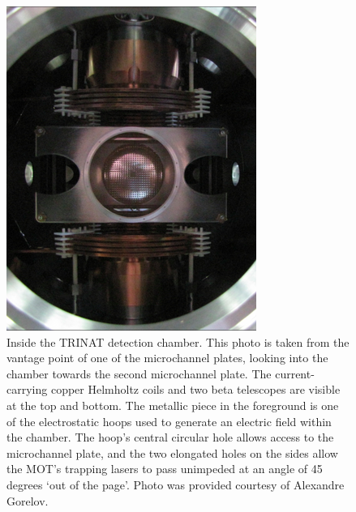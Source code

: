 \begin{figure}[h!b!t]
	\centering
	\includegraphics[width=.80\linewidth]{Figures/chamber_photo_2.png}
	\caption[A Photo from Inside the TRINAT Detection Chamber]{Inside the TRINAT detection chamber.  This photo is taken from the vantage point of one of the microchannel plates, looking into the chamber towards the second microchannel plate.  The current-carrying copper Helmholtz coils and two beta telescopes are visible at the top and bottom.  The metallic piece in the foreground is one of the electrostatic hoops used to generate an electric field within the chamber.  The hoop's central circular hole allows access to the microchannel plate, and the two elongated holes on the sides allow the MOT's trapping lasers to pass unimpeded at an angle of 45 degrees `out of the page'.  Photo was provided courtesy of Alexandre Gorelov.}
	\label{fig:thechamber}
\end{figure}


